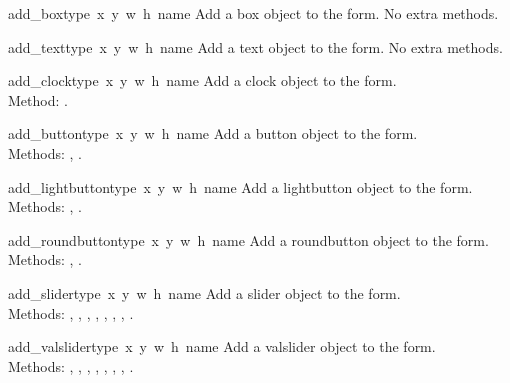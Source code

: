 \begin{flushleft}

\begin{funcdesc}{add_box}{type\, x\, y\, w\, h\, name}
Add a box object to the form.
No extra methods.
\end{funcdesc}

\begin{funcdesc}{add_text}{type\, x\, y\, w\, h\, name}
Add a text object to the form.
No extra methods.
\end{funcdesc}


\begin{funcdesc}{add_clock}{type\, x\, y\, w\, h\, name}
Add a clock object to the form. \\
Method:
.
\end{funcdesc}


\begin{funcdesc}{add_button}{type\, x\, y\, w\, h\,  name}
Add a button object to the form. \\
Methods:
,
.
\end{funcdesc}

\begin{funcdesc}{add_lightbutton}{type\, x\, y\, w\, h\, name}
Add a lightbutton object to the form. \\
Methods:
,
.
\end{funcdesc}

\begin{funcdesc}{add_roundbutton}{type\, x\, y\, w\, h\, name}
Add a roundbutton object to the form. \\
Methods:
,
.
\end{funcdesc}


\begin{funcdesc}{add_slider}{type\, x\, y\, w\, h\, name}
Add a slider object to the form. \\
Methods:
,
,
,
,
,
,
,
.
\end{funcdesc}

\begin{funcdesc}{add_valslider}{type\, x\, y\, w\, h\, name}
Add a valslider object to the form. \\
Methods:
,
,
,
,
,
,
,
.
\end{funcdesc}


\end{flushleft}
